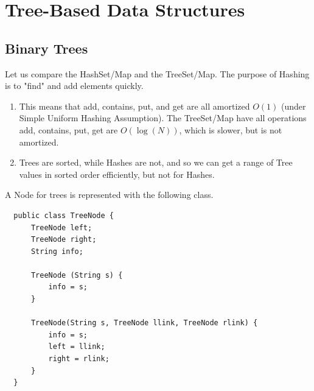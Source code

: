 \section{Tree-Based Data Structures} 

\subsection{Binary Trees} 

  Let us compare the HashSet/Map and the TreeSet/Map. The purpose of Hashing is to "find" and add elements quickly. 
  \begin{enumerate}
      \item This means that add, contains, put, and get are all amortized $O(1)$ (under Simple Uniform Hashing Assumption). The TreeSet/Map have all operations add, contains, put, get are $O(\log(N))$, which is slower, but is not amortized. 
      \item Trees are sorted, while Hashes are not, and so we can get a range of Tree values in sorted order efficiently, but not for Hashes. 
  \end{enumerate}

  A Node for trees is represented with the following class. 
  \begin{lstlisting}
  public class TreeNode {
      TreeNode left; 
      TreeNode right; 
      String info; 
      
      TreeNode (String s) {
          info = s; 
      }
      
      TreeNode(String s, TreeNode llink, TreeNode rlink) {
          info = s; 
          left = llink; 
          right = rlink; 
      }
  }
  \end{lstlisting}

